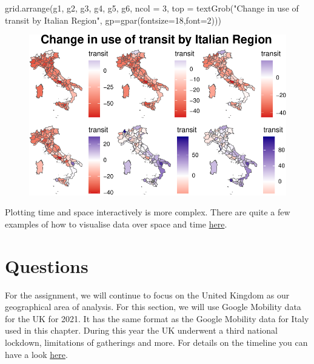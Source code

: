 \documentclass[
  letterpaper,
  DIV=11,
  numbers=noendperiod]{scrreprt}
\newenvironment{Shaded}{\begin{snugshade}}{\end{snugshade}}
\newcommand{\AttributeTok}[1]{\textcolor[rgb]{0.40,0.45,0.13}{#1}}
\newcommand{\DecValTok}[1]{\textcolor[rgb]{0.68,0.00,0.00}{#1}}
\newcommand{\FunctionTok}[1]{\textcolor[rgb]{0.28,0.35,0.67}{#1}}
\newcommand{\NormalTok}[1]{\textcolor[rgb]{0.00,0.23,0.31}{#1}}
\newcommand{\StringTok}[1]{\textcolor[rgb]{0.13,0.47,0.30}{#1}}
\begin{document}
\begin{Shaded}
\begin{Highlighting}[]
\FunctionTok{grid.arrange}\NormalTok{(g1, g2, g3, g4, g5, g6, }\AttributeTok{ncol =} \DecValTok{3}\NormalTok{, }
             \AttributeTok{top =} \FunctionTok{textGrob}\NormalTok{(}\StringTok{"Change in use of transit by Italian Region"}\NormalTok{, }\AttributeTok{gp=}\FunctionTok{gpar}\NormalTok{(}\AttributeTok{fontsize=}\DecValTok{18}\NormalTok{,}\AttributeTok{font=}\DecValTok{2}\NormalTok{)))}
\end{Highlighting}
\end{Shaded}

\begin{figure}[H]

{\centering \includegraphics{longitudinal-1_files/figure-pdf/join plots-1.pdf}

}

\end{figure}

Plotting time and space interactively is more complex. There are quite a
few examples of how to visualise data over space and time
\href{https://rstudio-pubs-static.s3.amazonaws.com/595502_57d6130e00384d99a6b0cea0e5212d44.html}{here}.

\hypertarget{questions-5}{%
\section{Questions}\label{questions-5}}

For the assignment, we will continue to focus on the United Kingdom as
our geographical area of analysis. For this section, we will use Google
Mobility data for the UK for 2021. It has the same format as the Google
Mobility data for Italy used in this chapter. During this year the UK
underwent a third national lockdown, limitations of gatherings and more.
For details on the timeline you can have a look
\href{https://www.instituteforgovernment.org.uk/sites/default/files/2022-12/timeline-coronavirus-lockdown-december-2021.pdf}{here}.
\end{document}
